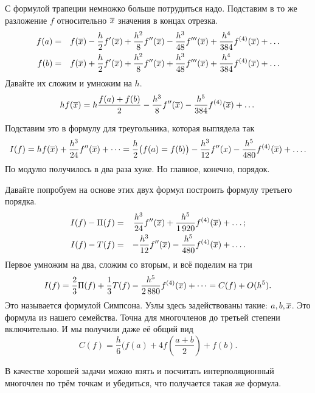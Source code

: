 С формулой трапеции немножко больше потрудиться надо. Подставим в то же разложение $f$ относительно $\overline{x}$ значения в концах отрезка.
\begin{eqnarray*}
f(a) &=& f(\overline{x}) - \frac h2 f'(\overline{x}) + \frac{h^2}8 f''(\overline{x}) - \frac{h^3}{48} f'''(\overline{x}) + \frac{h^4}{384} f^{(4)}(\overline{x})+\dots\\
f(b) &=& f(\overline{x}) + \frac h2 f'(\overline{x}) + \frac{h^2}8 f''(\overline{x}) + \frac{h^3}{48} f'''(\overline{x}) + \frac{h^4}{384} f^{(4)}(\overline{x})+\dots\\
\end{eqnarray*}
Давайте их сложим и умножим на $h$.
\begin{equation}\label{eq7-1}
  h f(\overline{x}) =  h\frac{f(a) + f(b)}{2} - \frac{h^3}8f''(\overline{x}) - \frac{h^5}{384} f^{(4)}(\overline{x}) + \dots
\end{equation}

Подставим это в формулу для треугольника, которая выглядела так
\[
  I(f) = hf(\overline{x}) + \frac{h^3}{24} f''(\overline{x}) + \dots = \frac h2 \big(f(a) = f(b)\big) - \frac{h^3}{12} f''(x) - \frac{h^5}{480} f^{(4)}(\overline{x}) + \dots.
\]
По модулю получилось в два раза хуже. Но главное, конечно, порядок.

Давайте попробуем на основе этих двух формул построить формулу третьего порядка.
\begin{eqnarray*}
I(f) - \Pi(f) &=&  \frac{h^3}{24} f''(\overline{x}) + \frac{h^5}{1\,920} f^{(4)}(\overline{x}) +\dots;\\
I(f) - T(f) &=&  -\frac{h^3}{12} f''(\overline{x}) - \frac{h^5}{480} f^{(4)}(\overline{x}) + \dots.\\
\end{eqnarray*}
Первое умножим на два, сложим со вторым, и всё поделим на три
\[
  I(f) = \frac23 \Pi(f) + \frac13 T(f) - \frac{h^5}{2\,880}f^{(4)}(\overline{x}) + \dots = C(f) + O(h^5).
\]
Это называется формулой Симпсона. Узлы здесь задействованы такие: $a,b,\overline{x}$. Это формула из нашего семейства. Точна для многочленов до третьей степени включительно. И мы получили даже её общий вид
\[
  C(f) = \frac h6\big(f(a) + 4 f\left( \frac{a+b}2 \right) + f(b).
\]

В качестве хорошей задачи можно взять и посчитать интерполяционный многочлен по трём точкам и убедиться, что получается такая же формула.

